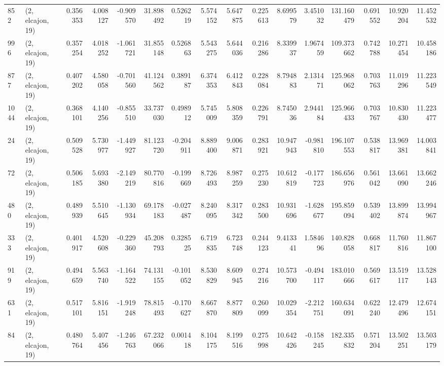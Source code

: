 \begin{tabular}{llrrrrrrrrrrrrrr}
852  &  (2, elcajon, 19) &   0.356353 &   4.008127 &  -0.909570 &     31.898492 &    0.526219 &    5.574152 &    5.647875 &  0.225613 &   8.699579 &   3.451032 &   131.160479 &   0.691552 &  10.920204 &  11.452532 \\
996  &  (2, elcajon, 19) &   0.357254 &   4.018252 &  -1.061721 &     31.855148 &    0.526863 &    5.543275 &    5.644036 &  0.216286 &   8.339937 &   1.967459 &   109.373662 &   0.742788 &  10.271454 &  10.458186 \\
877  &  (2, elcajon, 19) &   0.407202 &   4.580058 &  -0.701560 &     41.124562 &    0.389187 &    6.374353 &    6.412843 &  0.228084 &   8.794883 &   2.131471 &   125.968062 &   0.703763 &  11.019296 &  11.223549 \\
1044 &  (2, elcajon, 19) &   0.368101 &   4.140256 &  -0.855510 &     33.737030 &    0.498912 &    5.745009 &    5.808359 &  0.226791 &   8.745036 &   2.944184 &   125.966433 &   0.703767 &  10.830430 &  11.223477 \\
24   &  (2, elcajon, 19) &   0.509528 &   5.730977 &  -1.449927 &     81.123720 &   -0.204911 &    8.889400 &    9.006871 &  0.283921 &  10.947943 &  -0.981810 &   196.107553 &   0.538817 &  13.969381 &  14.003841 \\
72   &  (2, elcajon, 19) &   0.506185 &   5.693380 &  -2.149219 &     80.770816 &   -0.199669 &    8.726493 &    8.987259 &  0.275230 &  10.612819 &  -0.177723 &   186.656976 &   0.561042 &  13.661090 &  13.662246 \\
480  &  (2, elcajon, 19) &   0.489939 &   5.510645 &  -1.130934 &     69.178183 &   -0.027487 &    8.240095 &    8.317342 &  0.283500 &  10.931696 &  -1.628677 &   195.859094 &   0.539402 &  13.899874 &  13.994967 \\
333  &  (2, elcajon, 19) &   0.401917 &   4.520608 &  -0.229360 &     45.208793 &    0.328525 &    6.719835 &    6.723748 &  0.244123 &   9.413341 &   1.584696 &   140.828058 &   0.668817 &  11.760816 &  11.867100 \\
919  &  (2, elcajon, 19) &   0.494659 &   5.563740 &  -1.164522 &     74.131155 &   -0.101052 &    8.530829 &    8.609945 &  0.274216 &  10.573700 &  -0.494117 &   183.010666 &   0.569617 &  13.519117 &  13.528143 \\
631  &  (2, elcajon, 19) &   0.517101 &   5.816151 &  -1.919248 &     78.815493 &   -0.170627 &    8.667870 &    8.877809 &  0.260099 &  10.029354 &  -2.212751 &   160.634091 &   0.622240 &  12.479496 &  12.674151 \\
84   &  (2, elcajon, 19) &   0.480764 &   5.407456 &  -1.246763 &     67.232066 &    0.001418 &    8.104175 &    8.199516 &  0.275998 &  10.642426 &  -0.158245 &   182.335832 &   0.571204 &  13.502251 &  13.503179 \\

\end{tabular}
